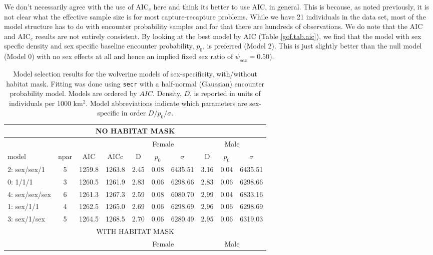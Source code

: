  We don't necessarily agree with the use of AIC$_c$ here and think its
 better to use AIC, in general. This is because, as noted previously,
 it is not clear what the effective sample size is for most
 capture-recapture problems. While we have 21 individuals in the data
 set, most of the model structure has to do with encounter probability
 samples and for that there are hundreds of observations. We do note
 that the AIC and AIC$_c$ results are not entirely consistent.  By
 looking at the best model by AIC (Table \ref{gof.tab.aic}), we find
 that the model with sex specfic density and sex specific baseline
 encounter probability, $p_{0}$, is preferred (Model 2). This is just
 slightly better than the null model (Model 0) with no sex effects at all
 and hence an implied fixed sex ratio of $\psi_{sex} = 0.50$).


\begin{table}[ht]
\centering
\caption{
  Model selection results for the  wolverine models of sex-specificity,
  with/without habitat mask.  Fitting was done 
  using  \mbox{\tt secr} with a half-normal (Gaussian) encounter probability
  model. Models are ordered by
  $AIC$. Density, $D$, is
  reported in units of individuals per 1000 km$^2$. Model abbreviations
  indicate which parameters are sex-specific in order $D/p_{0}/\sigma$.
}
\begin{tabular}{lccccccccc}
\hline \hline
\multicolumn{10}{c}{NO HABITAT MASK} \\ \hline
        &      &     &      & \multicolumn{3}{c}{Female} & \multicolumn{3}{c}{Male} \\ 
  model & npar & AIC & AICc & D & $p_0$ & $\sigma$ & D & $p_0$ &  $\sigma$  \\ \hline
2: sex/sex/1    &  5&  1259.8& 1263.8 &2.45& 0.08& 6435.51& 3.16& 0.04& 6435.51\\
0: 1/1/1        &  3&  1260.5& 1261.9 &2.83& 0.06& 6298.66& 2.83& 0.06& 6298.66\\
4: sex/sex/sex  &  6&  1261.3& 1267.3 &2.59& 0.08& 6080.70& 2.99& 0.04& 6833.16\\
1: sex/1/1      &  4&  1262.5& 1265.0 &2.69& 0.06& 6298.69& 2.96& 0.06& 6298.69\\
3: sex/1/sex    &  5&  1264.5& 1268.5 &2.70& 0.06& 6280.49& 2.95& 0.06& 6319.03\\
\hline \hline
\multicolumn{10}{c}{WITH HABITAT MASK} \\ \hline
        &      &     &      & \multicolumn{3}{c}{Female} & \multicolumn{3}{c}{Male} \\ 

\end{tabular}
\end{table}
